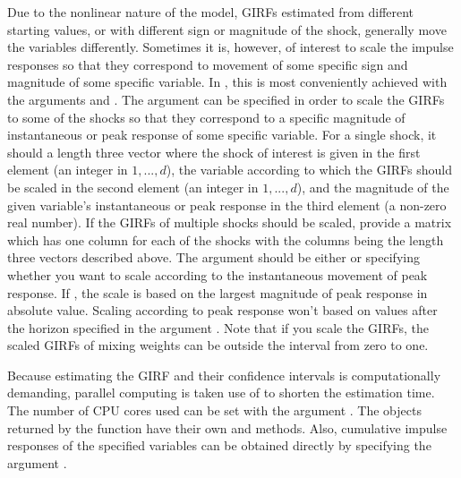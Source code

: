 \documentclass[nojss]{jss}
\begin{document}
Due to the nonlinear nature of the model, GIRFs estimated from different starting values, or with different sign or magnitude of the shock, generally move the variables differently. Sometimes it is, however, of interest to scale the impulse responses so that they correspond to movement of some specific sign and magnitude of some specific variable. In , this is most conveniently achieved with the arguments  and . The argument  can be specified in order to scale the GIRFs to some of the shocks so that they correspond to a specific magnitude of instantaneous or peak response of some specific variable. For a single shock, it should a length three vector where the shock of interest is given in the first element (an integer in $1,...,d$), the variable according to which the GIRFs should be scaled in the second element (an integer in $1,...,d$), and the magnitude of the given variable's instantaneous or peak response in the third element (a non-zero real number). If the GIRFs of multiple shocks should be scaled, provide a matrix which has one column for each of the shocks with the columns being the length three vectors described above. The argument  should be either  or  specifying whether you want to scale according to the instantaneous movement of peak response. If , the scale is based on the largest magnitude of peak response in absolute value. Scaling according to peak response won't based on values after the horizon specified in the argument . Note that if you scale the GIRFs, the scaled GIRFs of mixing weights can be outside the interval from zero to one.

Because estimating the GIRF and their confidence intervals is computationally demanding, parallel computing is taken use of to shorten the estimation time. The number of CPU cores used can be set with the argument . The objects returned by the  function have their own  and  methods. Also, cumulative impulse responses of the specified variables can be obtained directly by specifying the argument .
\end{document}
